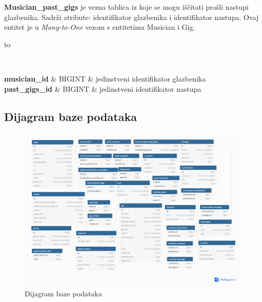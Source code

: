 		\textbf{Musician\_past\_gigs} je vezna tablica iz koje se mogu iščitati prošli nastupi glazbenika. Sadrži atribute: identifikator glazbenika i identifikator nastupa. Ovaj entitet je u \textit{Many-to-One} vezom s entitetima Musician i Gig.
	\begin{longtabu} to \textwidth {|X[6, l+3]|X[6, l]|X[20, l]|}
		
		\hline {}	 \\[3pt] \hline
		\endfirsthead
		
		\hline 
		\endlastfoot
		
		\textbf{musician\_id} & BIGINT & jedinstveni identifikator glazbenika \\ \hline
		\textbf{past\_gigs\_id} & BIGINT & jedinstveni identifikator nastupa \\ \hline
		
		
		
	\end{longtabu}
	


			
			\subsection{Dijagram baze podataka}
			
			\begin{figure}[H]
			\begin{center}
				\includegraphics[width=17cm]{slike/ERModel.PNG}
			\end{center}
			\caption{Dijagram baze podataka}
			\label{fig:dijagramBaze}
		\end{figure}
			
